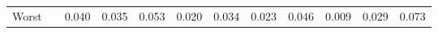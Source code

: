 \begin{table*}
\begin{center}
\begin{tabular}{lccccccccccc}
Worst &  & 0.040 & 0.035 & 0.053 & 0.020 & 0.034 & 0.023 & 0.046 & 0.009 & 0.029 & 0.073 \\


\end{tabular}
\end{center}
\end{table*}
